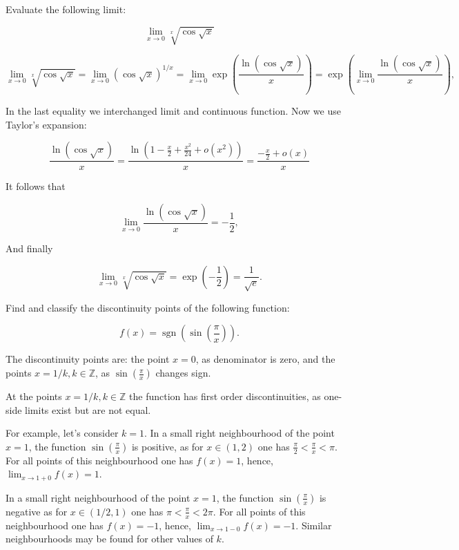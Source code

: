 \documentclass[addpoints, answers]{exam} %
\DeclareMathOperator{\sgn}{sgn}
\begin{document}
\begin{questions}

\question[10] Evaluate the following limit:

\[
\lim_{x \to 0} \sqrt[x]{\cos \sqrt{x}}
\]

\begin{solution}

\[
\lim_{x \rightarrow 0} \sqrt[x]{\cos \sqrt{x}} = \lim_{x \rightarrow 0} \left({\cos \sqrt{x}}\right) ^{1/x} =  \lim_{x \rightarrow 0} \exp
\left( \frac{\ln (\cos \sqrt{x})}{x} \right) = \exp \left( \lim_{x \rightarrow 0}
\frac{\ln (\cos \sqrt{x})}{x} \right),
\]

In the last equality we interchanged limit and continuous function. Now we use Taylor's expansion:

\[
\frac{\ln (\cos \sqrt{x})}{x} = \frac{\ln (1-
\frac{x}{2}+\frac{x^2}{24}+o(x^2))}{x} = \frac{-\frac{x}{2}+o(x)}{x}
\]

\noindent It follows that

\[
\lim_{x \rightarrow 0} \frac{\ln (\cos \sqrt{x})}{x} = -\frac{1}{2},
\]

\noindent And finally

\[
\lim_{x \rightarrow 0} \sqrt[x]{\cos \sqrt{x}} = \exp \left( -\frac{1}{2}\right) = \frac{1}{\sqrt{e}}.
\]
\end{solution}

\question[10] Find and classify the discontinuity points of the following function:

\[
f(x) = {\sgn} \left(\sin \left( \frac{\pi}{x}\right)\right).
\]

\begin{solution}
The discontinuity points are: the point $x=0$, as denominator is zero, and the points $x=1/k, k \in \mathbb{Z}$, as $\sin \left( \frac{\pi}{x}\right)$ changes sign.


At the points $x=1/k, k \in \mathbb{Z}$ the function has first order discontinuities, as one-side limits exist but are not equal.

For example, let's consider $k=1$. In a small right neighbourhood of the point $x=1$, the function $\sin \left( \frac{\pi}{x} \right)$ is positive, as for $x \in (1,2)$ one has $\frac{\pi}{2} < \frac{\pi}{x} < \pi$. For all points of this neighbourhood one has $f(x) = 1$, hence, $\lim_{x \rightarrow 1+0} f(x) = 1$.

In a small right neighbourhood of the point $x=1$, the function $\sin \left( \frac{\pi}{x} \right)$ is negative as for $x \in (1/2,1)$ one has $\pi < \frac{\pi}{x} < 2 \pi$. For all points of this neighbourhood one has $f(x) = -1$, hence, $\lim_{x \rightarrow 1-0} f(x) = -1$. Similar neighbourhoods may be found for other values of $k$.




\end{solution}
\end{questions}
\end{document}
